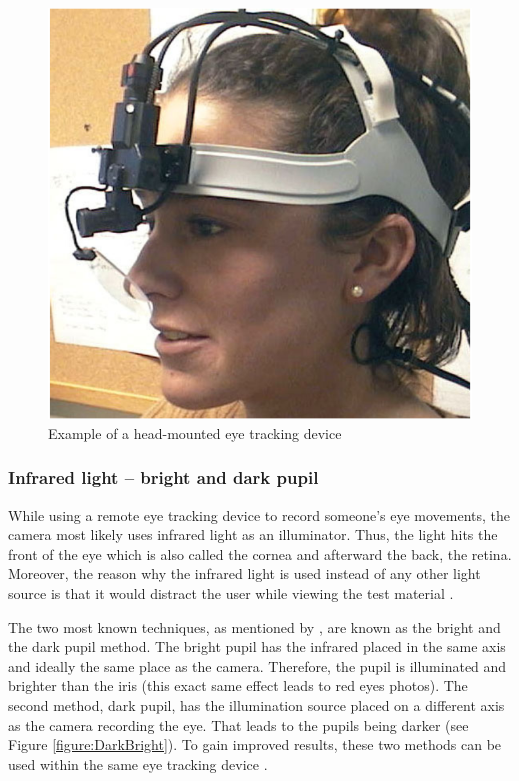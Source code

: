 \begin{figure}[!ht]
    \centering
    \includegraphics[width=0.75\linewidth]{images/headmounted_goldberg2002eye.png}
    \caption{
        Example of a head-mounted eye tracking device \autocite[12]{goldberg2002eye}
    }
    \label{figure:HeadMounted}
\end{figure}

\subsubsection{Infrared light -- bright and dark pupil}
While using a remote eye tracking device to record someone's eye movements, the camera most likely uses infrared light as an illuminator. Thus, the light hits the front of the eye which is also called the cornea and afterward the back, the retina. 
Moreover, the reason why the infrared light is used instead of any other light source is that it would distract the user while viewing the test material \autocite[]{poole2006eye, biedert2010eyebook}.

The two most known techniques, as mentioned by \textcite[]{goldberg2002eye}, are known as the bright and the dark pupil method. The bright pupil has the infrared placed in the same axis and ideally the same place as the camera. Therefore, the pupil is illuminated and brighter than the iris (this exact same effect leads to red eyes photos). The second method, dark pupil, has the illumination source placed on a different axis as the camera recording the eye. That leads to the pupils being darker (see Figure \ref{figure:DarkBright}). To gain improved results, these two methods can be used within the same eye tracking device \autocite[]{tobii2018dark, goldberg2002eye}. 

